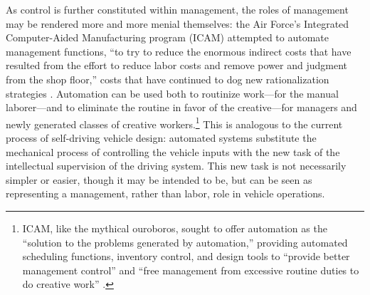 

As control is further constituted within management, the roles of
management may be rendered more and more menial themselves: the Air
Force's Integrated Computer-Aided Manufacturing program (ICAM)
attempted to automate
management functions, ``to try to reduce the enormous indirect costs
that have resulted from the effort to reduce labor costs and remove
power and judgment from the shop floor,'' costs that have continued to
dog new rationalization strategies \cite[p. 330]{nobleForces}. Automation
can be used both to routinize work---for the manual laborer---and to
eliminate the routine in favor of the creative---for managers and newly
generated classes of creative workers.\footnote{ICAM, like the mythical
ouroboros, sought to offer automation as the ``solution to the problems
generated by automation,'' providing automated scheduling functions,
inventory control, and design tools to ``provide better management
control'' and ``free management from excessive routine duties to do
creative work'' \cite[p. 330]{nobleForces}.} This is analogous to the
current process of self-driving vehicle design: automated systems
substitute the mechanical process of controlling the vehicle inputs
with the new task of the intellectual supervision of the driving
system. This new task is not necessarily simpler or easier, though it
may be intended to be, but can be seen as representing a management,
rather than labor, role in vehicle operations.


